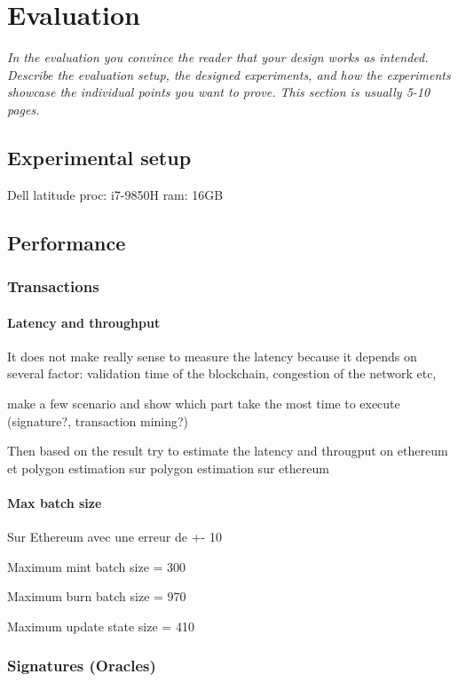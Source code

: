 \documentclass[a4paper,11pt,oneside]{report}
\begin{document}
\chapter{Evaluation}

\textit{In the evaluation you convince the reader that your design works as intended.
Describe the evaluation setup, the designed experiments, and how the
experiments showcase the individual points you want to prove.
This section is usually 5-10 pages.} \\

\section{Experimental setup}
Dell latitude 
proc: i7-9850H
ram: 16GB


\section{Performance}

\subsection{Transactions}

\subsubsection{Latency and throughput}
It does not make really sense to measure the latency because it depends on several factor: validation time of the blockchain, congestion of the network etc,


make a few scenario and show which part take the most time to execute (signature?, transaction mining?)


Then based on the result try to estimate the latency and througput on ethereum et polygon
estimation sur polygon
estimation sur ethereum

\subsubsection{Max batch size}
Sur Ethereum avec une erreur de +- 10 

Maximum mint batch size = 300 

Maximum burn batch size = 970

Maximum update state size = 410

\subsection{Signatures (Oracles)}
\end{document}
